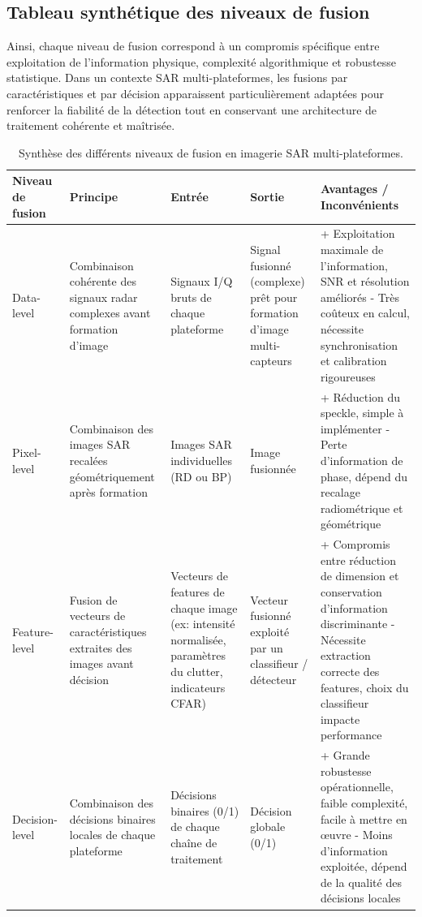 \subsection{Tableau synthétique des niveaux de fusion}

Ainsi, chaque niveau de fusion correspond à un compromis spécifique entre exploitation de l’information physique, complexité algorithmique et robustesse statistique.  
Dans un contexte SAR multi-plateformes, les fusions par caractéristiques et par décision apparaissent particulièrement adaptées pour renforcer la fiabilité de la détection tout en conservant une architecture de traitement cohérente et maîtrisée.

\begin{table}[H]
\centering
\small
\renewcommand{\arraystretch}{1.1}
\setlength{\tabcolsep}{3pt} %
\begin{tabular}{p{2.2cm} p{2.8cm} p{2.2cm} p{2.2cm} p{3.8cm}}
\toprule
\textbf{Niveau de fusion} & \textbf{Principe} & \textbf{Entrée} & \textbf{Sortie} & \textbf{Avantages / Inconvénients} \\
\midrule
Data-level & Combinaison cohérente des signaux radar complexes avant formation d'image & Signaux I/Q bruts de chaque plateforme & Signal fusionné (complexe) prêt pour formation d'image multi-capteurs & + Exploitation maximale de l’information, SNR et résolution améliorés \newline - Très coûteux en calcul, nécessite synchronisation et calibration rigoureuses \\
\hline
Pixel-level & Combinaison des images SAR recalées géométriquement après formation & Images SAR individuelles (RD ou BP) & Image fusionnée & + Réduction du speckle, simple à implémenter \newline - Perte d’information de phase, dépend du recalage radiométrique et géométrique \\
\hline
Feature-level & Fusion de vecteurs de caractéristiques extraites des images avant décision & Vecteurs de features de chaque image (ex: intensité normalisée, paramètres du clutter, indicateurs CFAR) & Vecteur fusionné exploité par un classifieur / détecteur & + Compromis entre réduction de dimension et conservation d’information discriminante \newline - Nécessite extraction correcte des features, choix du classifieur impacte performance \\
\hline
Decision-level & Combinaison des décisions binaires locales de chaque plateforme & Décisions binaires (0/1) de chaque chaîne de traitement & Décision globale (0/1) & + Grande robustesse opérationnelle, faible complexité, facile à mettre en œuvre \newline - Moins d’information exploitée, dépend de la qualité des décisions locales \\
\bottomrule
\end{tabular}
\caption{Synthèse des différents niveaux de fusion en imagerie SAR multi-plateformes.}
\label{tab:fusion_levels_summary}
\end{table}
